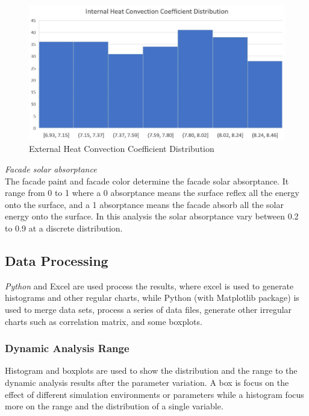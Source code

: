 \documentclass[11pt, a4paper]{article}
\theoremstyle{definition}
\begin{document}
			\begin{figure}[H]
			\centering
			\includegraphics[scale=0.5]{Hongger_InConvDist.jpg}
			\caption{External Heat Convection Coefficient Distribution}
			\label{fig:HonggerExtConvDist}
			\end{figure}
			

		\textit{Facade solar absorptance}\\
			The facade paint and facade color determine the facade solar absorptance. It range from 0 to 1 where a 0 absorptance means the surface reflex all the energy onto the surface, and a 1 absorptance means the facade absorb all the solar energy onto the surface. In this analysis the solar absorptance vary between 0.2 to 0.9 at a discrete distribution.
	
	\subsection{Data Processing}
		\textit{Python} and Excel are used process the results, where excel is used to generate histograms and other regular charts, while Python (with Matplotlib package) is used to merge data sets, process a series of data files, generate other irregular charts such as correlation matrix, and some boxplots.

		\subsubsection{Dynamic Analysis Range}
			Histogram and boxplots are used to show the distribution and the range to the dynamic analysis results after the parameter variation. A box is focus on the effect of different simulation environments or parameters while a histogram focus more on the range and the distribution of a single variable.
\end{document}
